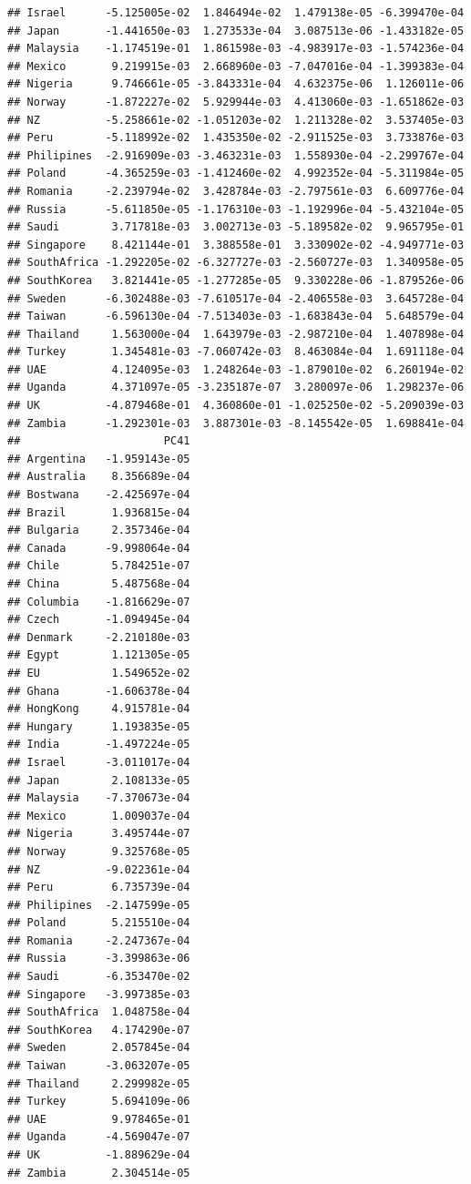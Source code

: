 \documentclass[11pt,preprint, authoryear]{elsarticle}
\numberwithin{equation}{section}
\numberwithin{figure}{section}
\numberwithin{table}{section}
\begin{document}
\begin{verbatim}
## Israel      -5.125005e-02  1.846494e-02  1.479138e-05 -6.399470e-04
## Japan       -1.441650e-03  1.273533e-04  3.087513e-06 -1.433182e-05
## Malaysia    -1.174519e-01  1.861598e-03 -4.983917e-03 -1.574236e-04
## Mexico       9.219915e-03  2.668960e-03 -7.047016e-04 -1.399383e-04
## Nigeria      9.746661e-05 -3.843331e-04  4.632375e-06  1.126011e-06
## Norway      -1.872227e-02  5.929944e-03  4.413060e-03 -1.651862e-03
## NZ          -5.258661e-02 -1.051203e-02  1.211328e-02  3.537405e-03
## Peru        -5.118992e-02  1.435350e-02 -2.911525e-03  3.733876e-03
## Philipines  -2.916909e-03 -3.463231e-03  1.558930e-04 -2.299767e-04
## Poland      -4.365259e-03 -1.412460e-02  4.992352e-04 -5.311984e-05
## Romania     -2.239794e-02  3.428784e-03 -2.797561e-03  6.609776e-04
## Russia      -5.611850e-05 -1.176310e-03 -1.192996e-04 -5.432104e-05
## Saudi        3.717818e-03  3.002713e-03 -5.189582e-02  9.965795e-01
## Singapore    8.421144e-01  3.388558e-01  3.330902e-02 -4.949771e-03
## SouthAfrica -1.292205e-02 -6.327727e-03 -2.560727e-03  1.340958e-05
## SouthKorea   3.821441e-05 -1.277285e-05  9.330228e-06 -1.879526e-06
## Sweden      -6.302488e-03 -7.610517e-04 -2.406558e-03  3.645728e-04
## Taiwan      -6.596130e-04 -7.513403e-03 -1.683843e-04  5.648579e-04
## Thailand     1.563000e-04  1.643979e-03 -2.987210e-04  1.407898e-04
## Turkey       1.345481e-03 -7.060742e-03  8.463084e-04  1.691118e-04
## UAE          4.124095e-03  1.248264e-03 -1.879010e-02  6.260194e-02
## Uganda       4.371097e-05 -3.235187e-07  3.280097e-06  1.298237e-06
## UK          -4.879468e-01  4.360860e-01 -1.025250e-02 -5.209039e-03
## Zambia      -1.292301e-03  3.887301e-03 -8.145542e-05  1.698841e-04
##                      PC41
## Argentina   -1.959143e-05
## Australia    8.356689e-04
## Bostwana    -2.425697e-04
## Brazil       1.936815e-04
## Bulgaria     2.357346e-04
## Canada      -9.998064e-04
## Chile        5.784251e-07
## China        5.487568e-04
## Columbia    -1.816629e-07
## Czech       -1.094945e-04
## Denmark     -2.210180e-03
## Egypt        1.121305e-05
## EU           1.549652e-02
## Ghana       -1.606378e-04
## HongKong     4.915781e-04
## Hungary      1.193835e-05
## India       -1.497224e-05
## Israel      -3.011017e-04
## Japan        2.108133e-05
## Malaysia    -7.370673e-04
## Mexico       1.009037e-04
## Nigeria      3.495744e-07
## Norway       9.325768e-05
## NZ          -9.022361e-04
## Peru         6.735739e-04
## Philipines  -2.147599e-05
## Poland       5.215510e-04
## Romania     -2.247367e-04
## Russia      -3.399863e-06
## Saudi       -6.353470e-02
## Singapore   -3.997385e-03
## SouthAfrica  1.048758e-04
## SouthKorea   4.174290e-07
## Sweden       2.057845e-04
## Taiwan      -3.063207e-05
## Thailand     2.299982e-05
## Turkey       5.694109e-06
## UAE          9.978465e-01
## Uganda      -4.569047e-07
## UK          -1.889629e-04
## Zambia       2.304514e-05
\end{verbatim}
\end{document}
